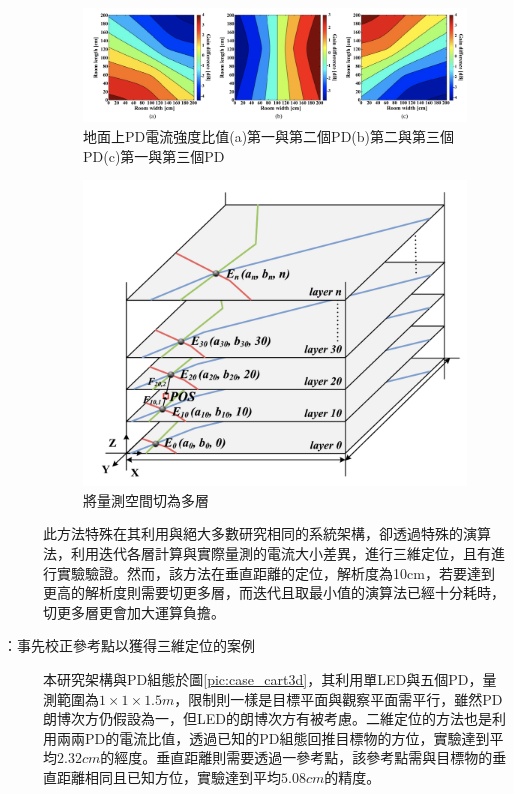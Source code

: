 \begin{description}
        \begin{figure}[h]
            \centering
            \includegraphics[width=12cm]{ch2pic/layers_2d.png}
            \caption{地面上PD電流強度比值(a)第一與第二個PD(b)第二與第三個PD(c)第一與第三個PD\cite{case:3d_layers}}
            \label{pic:layers_2d}
        \end{figure}

        \begin{figure}[h]
            \centering
            \includegraphics[width=12cm]{ch2pic/layers_3d.png}
            \caption{\cite{case:3d_layers}將量測空間切為多層}
            \label{pic:layers_3d}
        \end{figure}

        \qquad
        此方法特殊在其利用與絕大多數研究相同的系統架構，卻透過特殊的演算法，利用迭代各層計算與實際量測的電流大小差異，進行三維定位，且有進行實驗驗證。然而，該方法在垂直距離的定位，解析度為10cm，若要達到更高的解析度則需要切更多層，而迭代且取最小值的演算法已經十分耗時，切更多層更會加大運算負擔。

        \item[\cite{case:cart3d}：事先校正參考點以獲得三維定位的案例] \hfill 
        
        \qquad
        本研究架構與PD組態於圖\ref{pic:case_cart3d}，其利用單LED與五個PD，量測範圍為$1\times 1\times 1.5m$，限制則一樣是目標平面與觀察平面需平行，雖然PD朗博次方仍假設為一，但LED的朗博次方有被考慮。二維定位的方法也是利用兩兩PD的電流比值，透過已知的PD組態回推目標物的方位，實驗達到平均$2.32cm$的經度。垂直距離則需要透過一參考點，該參考點需與目標物的垂直距離相同且已知方位，實驗達到平均$5.08cm$的精度。


\end{description}
